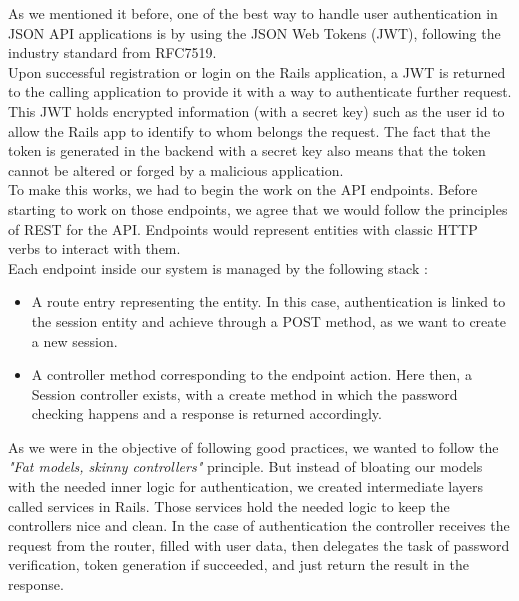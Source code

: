 \documentclass{eplmastersthesis}
\begin{document}
          As we mentioned it before, one of the best way to handle user
          authentication in JSON API applications is by using the JSON Web
          Tokens (JWT), following the industry standard from RFC7519.\\

          Upon successful registration or login on the Rails application, a
          JWT is returned to the calling application to provide it with a way
          to authenticate further request. This JWT holds encrypted
          information (with a secret key) such as the user id to allow the Rails
          app to identify to whom belongs the request. The fact that the token
          is generated in the backend with a secret key also means that the
          token cannot be altered or forged by a malicious application.\\

          To make this works, we had to begin the work on the API endpoints.
          Before starting to work on those endpoints, we agree that we would
          follow the principles of REST \cite{rest} for the API. Endpoints would
          represent entities with classic HTTP verbs to interact with them.\\

          Each endpoint inside our system is managed by the following stack :

          \begin{itemize}
            \item A route entry representing the entity. In this case,
            authentication is linked to the session entity and achieve through
            a POST method, as we want to create a new session.
            \item A controller method corresponding to the endpoint action.
            Here then, a Session controller exists, with a create method in
            which the password checking happens and a response is returned
            accordingly.
          \end{itemize}

          As we were in the objective of following good practices, we wanted
          to follow the \textit{"Fat models, skinny controllers"} principle.
          But instead of bloating our models with the needed inner logic for
          authentication, we created intermediate layers called services
          in Rails. Those services hold the needed logic to keep the controllers
          nice and clean. In the case of authentication the controller receives
          the request from the router, filled with user data, then delegates
          the task of password verification, token generation if succeeded,
          and just return the result in the response.\\
\end{document}
